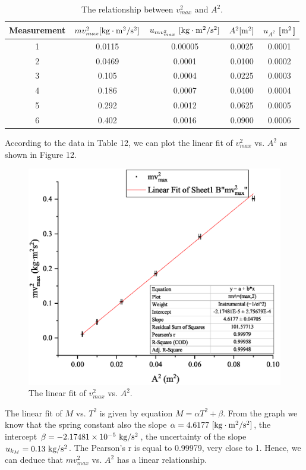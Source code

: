 \documentclass[a4paper]{report}
\begin{document}
	\begin{table}[H]
		\centering
		\begin{tabular}{|c|c|c|c|c|}
			\hline
			Measurement&$mv_{max}^2[\rm{kg\cdot m^2/s^2}]$&$u_{mv_{max}^2}\ [\rm{kg\cdot m^2/s^2}]$&$A^2[\rm{m^2}]$&$u_{A^2}$ [$\rm{m^2}$]\\
			\hline
			1&0.0115&0.00005&0.0025&0.0001\\
			\hline
			2&0.0469&0.0001&0.0100&0.0002\\
			\hline
			3&0.105&0.0004&0.0225&0.0003\\
			\hline
			4&0.186&0.0007&0.0400&0.0004\\
			\hline
			5&0.292&0.0012&0.0625&0.0005\\
			\hline
			6&0.402&0.0016&0.0900&0.0006\\
			\hline
		\end{tabular}
	\caption{The relationship between $v_{max}^2$ and $A^2$.}
	\end{table}
	According to the data in Table 12, we can plot the linear fit of $v_{max}^2$ vs. $A^2$ as shown in Figure 12.
	\begin{figure}[H]
		\centering
		\includegraphics[width=1\linewidth]{12.eps}
		\caption{The linear fit of $v_{max}^2$ vs. $A^2$.}
	\end{figure}
	The linear fit of $M$ vs. $T^2$ is given by equation $M=\alpha T^2+\beta$. From the graph we know that the spring constant also the slope $\alpha=4.6177\ \rm{[kg\cdot m^2/s^2]}$, the intercept $\beta=-2.17481\times10^{-5}\ \rm{kg/s^2}$, the uncertainty of the slope $u_{k_M}=0.13\ \rm{kg/s^2}$. The Pearson's r is equal to 0.99979, very close to 1. Hence, we can deduce that $mv_{max}^2$ vs. $A^2$ has a linear relationship.
\end{document}
